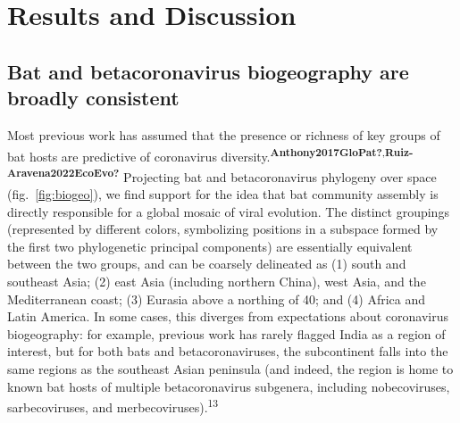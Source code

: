 \documentclass[10pt,oneside]{article}
\begin{document}
\hypertarget{results-and-discussion}{%
\section{Results and Discussion}\label{results-and-discussion}}

\hypertarget{bat-and-betacoronavirus-biogeography-are-broadly-consistent}{%
\subsection{Bat and betacoronavirus biogeography are broadly
consistent}\label{bat-and-betacoronavirus-biogeography-are-broadly-consistent}}

Most previous work has assumed that the presence or richness of key
groups of bat hosts are predictive of coronavirus
diversity.\textsuperscript{\textbf{Anthony2017GloPat?},\textbf{Ruiz-Aravena2022EcoEvo?}}
Projecting bat and betacoronavirus phylogeny over space
(fig.~\ref{fig:biogeo}), we find support for the idea that bat community
assembly is directly responsible for a global mosaic of viral evolution.
The distinct groupings (represented by different colors, symbolizing
positions in a subspace formed by the first two phylogenetic principal
components) are essentially equivalent between the two groups, and can
be coarsely delineated as (1) south and southeast Asia; (2) east Asia
(including northern China), west Asia, and the Mediterranean coast; (3)
Eurasia above a northing of 40; and (4) Africa and Latin America. In
some cases, this diverges from expectations about coronavirus
biogeography: for example, previous work has rarely flagged India as a
region of interest, but for both bats and betacoronaviruses, the
subcontinent falls into the same regions as the southeast Asian
peninsula (and indeed, the region is home to known bat hosts of multiple
betacoronavirus subgenera, including nobecoviruses, sarbecoviruses, and
merbecoviruses).\textsuperscript{13}
\end{document}
